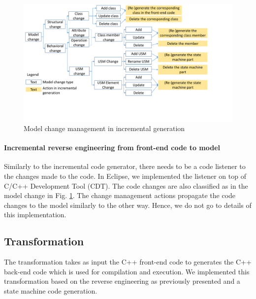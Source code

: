 \begin{figure}
	\centering
	\includegraphics[clip, trim=0.2cm 4cm 4.0cm 0.2cm, width=1\columnwidth]{figures/modelchange.pdf}
	\caption{Model change management in incremental generation} 
	\label{fig:modelchange}
\end{figure}

\noindent
\paragraph{Incremental reverse engineering from front-end code to model}
Similarly to the incremental code generator, there needs to be a code listener to the changes made to the code.
In Eclipse, we implemented the listener on top of C/C++ Development Tool (CDT).
The code changes are also classified as in the model change in Fig. \ref{fig:modelchange}.
The change management actions propagate the code changes to the model similarly to the other way.
Hence, we do not go to details of this implementation. 




\subsection{Transformation}
The transformation takes as input the C++ front-end code to generates the C++ back-end code which is used for compilation and execution.
We implemented this transformation based on the reverse engineering as previously presented and a state machine code generation. 

